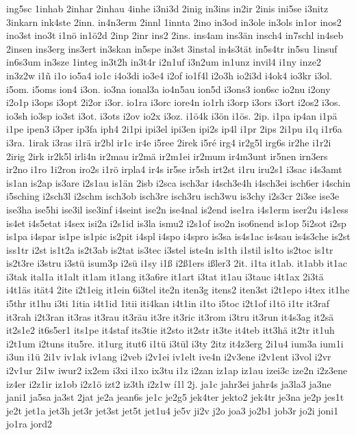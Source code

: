 {ing5sc
1inhab
2inhar
2inhau
4inhe
i3ni3d
2inig
in3ins
in2ir
2inis
ini5se
i3nitz
3inkarn
ink4ste
2inn.
in4n3erm
2innl
1innta
2ino
in3od
in3ole
in3ols
in1or
inos2
ino3st
ino3t
i1nö
in1ö2d
2inp
2inr
ins2
2ins.
ins4am
ins3än
insch4
in7schl
in4seb
2insen
ins3erg
ins3ert
in3skan
in5spe
in3st
3instal
in4s3tät
in5s4tr
in5su
1insuf
in6s3um
in3sze
1integ
in3t2h
in3t4r
i2n1uf
i3n2um
in1unz
invil4
i1ny
inze2
in3z2w
i1ñ
i1o
io5a4
io1c
i4o3di
io3e4
i2of
io1f4l
i2o3h
io2i3d
i4ok4
io3kr
i3ol.
i5om.
i5oms
ion4
i3on.
io3na
ional3a
io4n5au
ion5d
i3ons3
ion6sc
io2nu
i2ony
i2o1p
i3ops
i3opt
2i2or
i3or.
io1ra
i3orc
iore4n
io1rh
i3orp
i3ors
i3ort
i2os2
i3os.
io3sh
io3sp
io3st
i3ot.
i3ots
i2ov
io2x
i3oz.
i1ö4k
i3ön
i1ös.
2ip.
i1pa
ip4an
i1pä
i1pe
ipen3
i3per
ip3fa
iph4
2i1pi
ipi3el
ipi3en
ipi2s
ip4l
i1pr
2ips
2i1pu
i1q
i1r6a
i3ra.
1irak
i3ras
i1rä
ir2bl
ir1c
ir4e
i5ree
2irek
i5ré
irg4
ir2g5l
irg6s
ir2he
i1r2i
2irig
2irk
ir2k5l
irli4n
ir2mau
ir2mä
ir2m1ei
ir2mum
ir4m3unt
ir5nen
irn3ers
ir2no
i1ro
1i2ron
iro2s
i1rö
irpla4
ir4s
ir5se
ir5sh
irt2st
i1ru
iru2s1
i3sac
i4s3amt
is1an
is2ap
is3are
i2s1au
is1än
2isb
i2sca
isch3ar
i4sch3e4h
i4sch3ei
isch6er
i4schin
i5sching
i2sch3l
i2schm
isch3ob
isch3re
isch3ru
isch3wu
is3chy
i2s3cr
2i3se
ise3e
ise3ha
ise5hi
ise3il
ise3inf
i4seint
ise2n
ise4nal
is2end
ise1ra
i4s1erm
iser2u
i4s1ess
is4et
i4s5etat
i4sex
isi2a
i2s1id
is3la
ismu2
i2s1of
iso2n
iso6nend
is1op
5i2sot
i2sp
is1pa
i4spar
is1pe
is1pic
is2pit
i4spl
i4spo
i4spro
is3sa
is4s1ac
is4sau
is4s3che
is2st
iss1tr
i2st
is1t2a
is2t3ab
is2tat
is3tec
i3stel
iste4n
is1th
i1stil
is1to
is2toc
is1tr
is2t3re
i3stru
i3stü
isum3p
i2sü
i1sy
i1ß
i2ß1ers
ißler3
2it.
i1ta
it1ab.
it1abb
it1ac
i3tak
ital1a
it1alt
it1am
it1ang
it3a6re
it1art
i3tat
it1au
i3tauc
i4t1ax
2i3tä
i4t1äs
ität4
2ite
i2t1eig
it1ein
6i3tel
ite2n
iten3g
itens2
iten3st
i2t1epo
i4tex
it1he
i5thr
it1hu
i3ti
1itia
i4t1id
1itii
iti4kan
i4t1in
i1to
i5toc
i2t1of
i1tö
i1tr
it3raf
it3rah
i2t3ran
it3ras
it3rau
it3räu
it3re
it3ric
it3rom
i3tru
it3run
it4s3ag
it2sä
it2s1e2
it6s5er1
its1pe
it4staf
its3tie
it2sto
it2str
it3te
it4teb
itt3hä
it2tr
it1uh
i2t1um
i2tuns
itu5re.
it1urg
itut6
i1tü
i3tül
i3ty
2itz
it4z3erg
2i1u4
ium3a
ium1i
i3un
i1ü
2i1v
iv1ak
iv1ang
i2veb
i2v1ei
iv1elt
ive4n
i2v3ene
i2v1ent
i3vol
i2vr
i2v1ur
2i1w
iwur2
ix2em
i3xi
i1xo
ix3tu
i1z
i2zan
iz1ap
iz1au
izei3c
ize2n
i2z3ene
iz4er
i2z1ir
iz1ob
i2z1ö
izt2
iz3th
i2z1w
í1l
2j.
ja1c
jahr3ei
jahr4s
ja3la3
ja3ne
jani1
ja5sa
ja3st
2jat
je2a
jean6s
je1c
je2g5
jek4ter
jekto2
jek4tr
je3na
je2p
jes1t
je2t
jet1a
jet3h
jet3r
jet3st
jet5t
jet1u4
je5v
ji2v
j2o
joa3
jo2b1
job3r
jo2i
joni1
jo1ra
jord2
}
